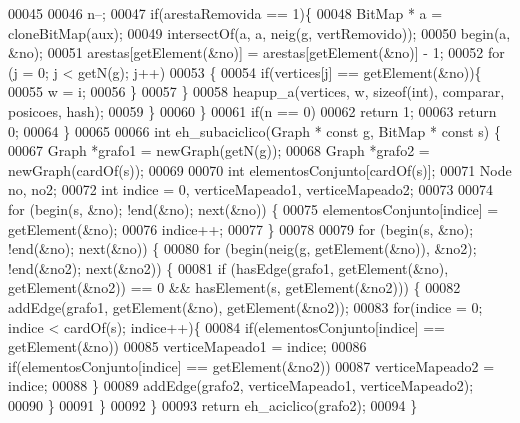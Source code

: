 \begin{DoxyCode}
00045 
00046         n--;
00047         \textcolor{keywordflow}{if}(arestaRemovida == 1)\{
00048             BitMap * a = cloneBitMap(aux);
00049             intersectOf(a, a, neig(g, vertRemovido));
00050             begin(a, &no);
00051             arestas[getElement(&no)] = arestas[getElement(&no)] - 1;
00052             \textcolor{keywordflow}{for} (j = 0; j < getN(g); j++)
00053             \{
00054                 \textcolor{keywordflow}{if}(vertices[j] == getElement(&no))\{
00055                     w = i;
00056                 \}
00057             \}
00058             heapup_a(vertices, w, \textcolor{keyword}{sizeof}(\textcolor{keywordtype}{int}), comparar, posicoes, hash);
00059         \}
00060     \}
00061     \textcolor{keywordflow}{if}(n == 0)
00062         \textcolor{keywordflow}{return} 1;
00063     \textcolor{keywordflow}{return} 0;
00064 \}
00065 
00066 \textcolor{keywordtype}{int} eh_subaciclico(Graph * \textcolor{keyword}{const} g, BitMap * \textcolor{keyword}{const} s) \{
00067     Graph *grafo1 = newGraph(getN(g));
00068     Graph *grafo2 = newGraph(cardOf(s));
00069     
00070     \textcolor{keywordtype}{int} elementosConjunto[cardOf(s)];
00071     Node no, no2;
00072     \textcolor{keywordtype}{int} indice = 0, verticeMapeado1, verticeMapeado2;
00073 
00074     \textcolor{keywordflow}{for} (begin(s, &no); !end(&no); next(&no)) \{
00075         elementosConjunto[indice] = getElement(&no);
00076         indice++;
00077     \}
00078 
00079     \textcolor{keywordflow}{for} (begin(s, &no); !end(&no); next(&no)) \{
00080         \textcolor{keywordflow}{for} (begin(neig(g, getElement(&no)), &no2); !end(&no2); next(&no2)) \{
00081             \textcolor{keywordflow}{if} (hasEdge(grafo1, getElement(&no), getElement(&no2)) == 0 && 
      hasElement(s, getElement(&no2))) \{
00082                 addEdge(grafo1, getElement(&no), getElement(&no2));
00083                 \textcolor{keywordflow}{for}(indice = 0; indice < cardOf(s); indice++)\{
00084                     \textcolor{keywordflow}{if}(elementosConjunto[indice] == getElement(&no))
00085                         verticeMapeado1 = indice;
00086                     \textcolor{keywordflow}{if}(elementosConjunto[indice] == getElement(&no2))
00087                         verticeMapeado2 = indice;
00088                 \}
00089                 addEdge(grafo2, verticeMapeado1, verticeMapeado2);
00090             \}
00091         \}
00092     \}
00093     \textcolor{keywordflow}{return} eh_aciclico(grafo2);
00094 \} 
\end{DoxyCode}
